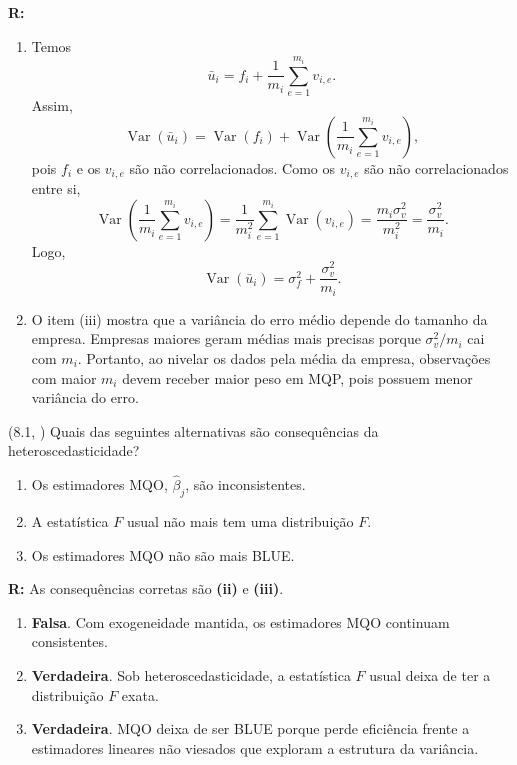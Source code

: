 \documentclass[12pt,letterpaper, onecolumn]{exam}
\renewenvironment{solution}
{\par\noindent\textbf{R:}\enspace\color{blue}}
{\par\color{black}}
\begin{document}
\begin{questions}
\begin{solution}
\begin{enumerate}[label=(\roman*)]
    \item Temos
    \[
    \bar{u}_i = f_i + \frac{1}{m_i}\sum_{e=1}^{m_i} v_{i,e}.
    \]
    Assim,
    \[
    \operatorname{Var}(\bar{u}_i)
    =
    \operatorname{Var}(f_i)
    +
    \operatorname{Var}\left(\frac{1}{m_i}\sum_{e=1}^{m_i} v_{i,e}\right),
    \]
    pois \(f_i\) e os \(v_{i,e}\) são não correlacionados. Como os \(v_{i,e}\) são não correlacionados entre si,
    \[
    \operatorname{Var}\left(\frac{1}{m_i}\sum_{e=1}^{m_i} v_{i,e}\right)
    =
    \frac{1}{m_i^2}\sum_{e=1}^{m_i}\operatorname{Var}(v_{i,e})
    =
    \frac{m_i\sigma_v^2}{m_i^2}
    =
    \frac{\sigma_v^2}{m_i}.
    \]
    Logo,
    \[
    \operatorname{Var}(\bar{u}_i)=\sigma_f^2+\frac{\sigma_v^2}{m_i}.
    \]

    \item O item (iii) mostra que a variância do erro médio depende do tamanho da empresa. Empresas maiores geram médias mais precisas porque \(\sigma_v^2/m_i\) cai com \(m_i\). Portanto, ao nivelar os dados pela média da empresa, observações com maior \(m_i\) devem receber maior peso em MQP, pois possuem menor variância do erro.
\end{enumerate}
\end{solution}

\vspace{0.7cm}

\question (8.1, \citep{wooldridge2016}) Quais das seguintes alternativas são consequências da heteroscedasticidade?
\begin{enumerate}[label=(\roman*)]
    \item Os estimadores MQO, \(\hat{\beta}_j\), são inconsistentes.
    \item A estatística \(F\) usual não mais tem uma distribuição \(F\).
    \item Os estimadores MQO não são mais BLUE.
\end{enumerate}

\begin{solution}
As consequências corretas são \textbf{(ii)} e \textbf{(iii)}.

\begin{enumerate}[label=(\roman*)]
    \item \textbf{Falsa}. Com exogeneidade mantida, os estimadores MQO continuam consistentes.
    \item \textbf{Verdadeira}. Sob heteroscedasticidade, a estatística \(F\) usual deixa de ter a distribuição \(F\) exata.
    \item \textbf{Verdadeira}. MQO deixa de ser BLUE porque perde eficiência frente a estimadores lineares não viesados que exploram a estrutura da variância.
\end{enumerate}
\end{solution}


\end{questions}
\end{document}
